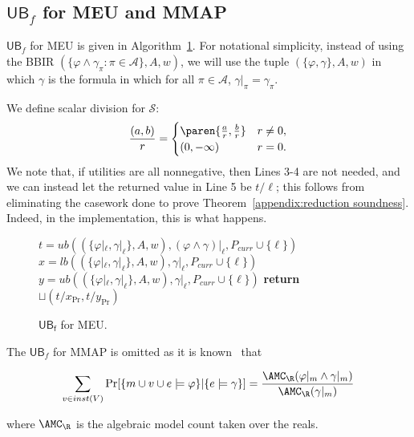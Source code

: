 \subsection{$\mathsf{UB}_f$ for MEU and MMAP}
\label{appendix:ub_f}

$\mathsf{UB}_f$ for MEU is given in Algorithm~\ref{algorithm:ub_f meu}.
For notational simplicity, instead of using the BBIR 
$(\{\varphi \land \gamma_{\pi} : \pi \in \mathcal A\}, A, w)$, 
we will use
the tuple $(\{\varphi, \gamma\}, A, w)$ 
in which $\gamma$ is the formula in which
for all $\pi \in \mathcal A$, $\gamma|_{\pi} = \gamma_{\pi}$. 

We define 
scalar division for $\mathcal S$:
\begin{equation}
  \frac{(a,b)}{r} = \begin{cases}
    \paren{\frac a r , \frac b r} & r \neq 0, \\
    (0, -\infty) & r = 0.
  \end{cases}
\end{equation}
We note that, if utilities are all nonnegative, 
then Lines 3-4 are not needed, and we can instead let the returned value in
Line 5 be $t/\ell$; this follows from 
eliminating the casework done to 
prove Theorem~\ref{appendix:reduction soundness}.
Indeed, in the implementation, this is what happens.

\begin{figure}
  \begin{mdframed}{\footnotesize\begin{algorithmic}[1]
    \State $t = ub((\{\varphi|_{\ell}, \gamma|_{\ell}\}, A, w),
        (\varphi \land \gamma)|_{\ell} , P_{curr} \cup \{\ell\})$
        \State $x = lb((\{\varphi|_{\ell}, \gamma|_{\ell}\}, A, w),
        \gamma|_{\ell} , P_{curr} \cup \{\ell\})$
        \State $y = ub((\{\varphi|_{\ell}, \gamma|_{\ell}\}, A, w),
        \gamma|_{\ell} , P_{curr} \cup \{\ell\})$
        \State \textbf{return } $\sqcup (t/x_{\Pr}, t/y_{\Pr})$
  \EndProcedure
  \end{algorithmic}}\end{mdframed}
  \caption{$\mathsf{UB_f}$ for MEU.}
  \label{algorithm:ub_f meu}
\end{figure}

The $\mathsf{UB}_f$ for MMAP is omitted as it is known~\citep{huang2006solving} that

\begin{align*}
  \sum_{v \in inst(V)}
  \Pr[\{m \cup v \cup e \models \varphi\} | \{e \models \gamma\}]
  = \frac{\AMC_{\R} (\varphi |_m \land \gamma|_m)}{ \AMC_{\R}(\gamma|_m)}
\end{align*}

where $\AMC_{\R}$ is the algebraic model count taken over the reals.